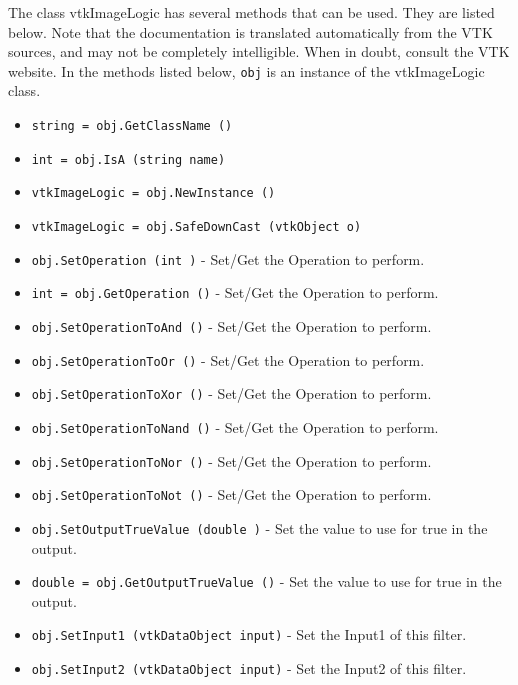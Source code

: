 The class vtkImageLogic has several methods that can be used.
  They are listed below.
Note that the documentation is translated automatically from the VTK sources,
and may not be completely intelligible.  When in doubt, consult the VTK website.
In the methods listed below, \verb|obj| is an instance of the vtkImageLogic class.
\begin{itemize}
\item  \verb|string = obj.GetClassName ()|

\item  \verb|int = obj.IsA (string name)|

\item  \verb|vtkImageLogic = obj.NewInstance ()|

\item  \verb|vtkImageLogic = obj.SafeDownCast (vtkObject o)|

\item  \verb|obj.SetOperation (int )| -  Set/Get the Operation to perform.

\item  \verb|int = obj.GetOperation ()| -  Set/Get the Operation to perform.

\item  \verb|obj.SetOperationToAnd ()| -  Set/Get the Operation to perform.

\item  \verb|obj.SetOperationToOr ()| -  Set/Get the Operation to perform.

\item  \verb|obj.SetOperationToXor ()| -  Set/Get the Operation to perform.

\item  \verb|obj.SetOperationToNand ()| -  Set/Get the Operation to perform.

\item  \verb|obj.SetOperationToNor ()| -  Set/Get the Operation to perform.

\item  \verb|obj.SetOperationToNot ()| -  Set/Get the Operation to perform.

\item  \verb|obj.SetOutputTrueValue (double )| -  Set the value to use for true in the output.

\item  \verb|double = obj.GetOutputTrueValue ()| -  Set the value to use for true in the output.

\item  \verb|obj.SetInput1 (vtkDataObject input)| -  Set the Input1 of this filter. 

\item  \verb|obj.SetInput2 (vtkDataObject input)| -  Set the Input2 of this filter.

\end{itemize}
